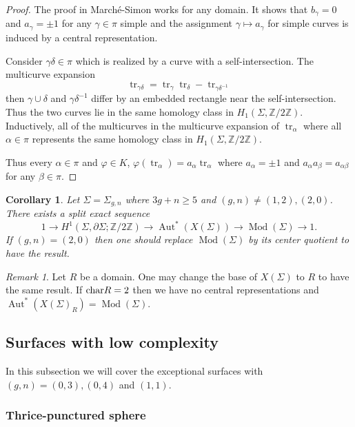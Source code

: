 \documentclass[11pt]{amsart}
\numberwithin{theorem}{section}
\newtheorem{corollary}[theorem]{Corollary}
\theoremstyle{definition}
\theoremstyle{remark}
\newtheorem*{remark}{Remark}
\newcommand{\Z}{{\mathbb{Z}}}
\renewcommand{\char}{\textup{char}}
\DeclareMathOperator{\Aut}{Aut}
\DeclareMathOperator{\Mod}{Mod}
\DeclareMathOperator{\tr}{tr}
\newcommand{\<}{\langle}
\renewcommand{\>}{\rangle}
\begin{document}
\begin{proof}
    The proof in March\'e-Simon works for any domain. It shows that $b_\gamma = 0$ and $a_\gamma = \pm 1$ for any $\gamma \in \pi$ simple and the assignment $\gamma \mapsto a_\gamma$ for simple curves is induced by a central representation.

    
    Consider $\gamma \delta \in \pi$ which is realized by a curve with a self-intersection. The multicurve expansion
    \[
    \tr_{\gamma\delta} = \tr_{\gamma}\tr_\delta - \tr_{\gamma \delta^{-1}}
    \]
    then $\gamma \cup \delta$ and $\gamma \delta^{-1}$ differ by an embedded rectangle near the self-intersection. Thus the two curves lie in the same homology class in $H_1(\Sigma, \Z / 2\Z)$. Inductively, all of the multicurves in the multicurve expansion of $\tr_\alpha$ where all $\alpha \in \pi$ represents the same homology class in $H_1(\Sigma, \Z / 2\Z)$.

    Thus every $\alpha \in \pi$ and $\varphi \in K$, $\varphi(\tr_\alpha) = a_\alpha \tr_\alpha$ where $a_\alpha = \pm 1$ and $a_\alpha a_\beta = a_{\alpha \beta}$ for any $\beta \in \pi$.
\end{proof}

\begin{corollary}\label{main}
    Let $\Sigma = \Sigma_{g, n}$ where $3g + n \geq 5$ and $(g, n) \neq (1, 2), (2, 0)$. There exists a split exact sequence
    \[
    1 \rightarrow H^1(\Sigma, \partial \Sigma ; \Z / 2\Z) \rightarrow \Aut^*(X(\Sigma)) \rightarrow \Mod(\Sigma) \rightarrow 1.
    \] 
    If $(g, n) = (2, 0)$ then one should replace $\Mod(\Sigma)$ by its center quotient to have the result.
\end{corollary}

\begin{remark}
    Let $R$ be a domain. One may change the base of $X(\Sigma)$ to $R$ to have the same result. If $\char R = 2$ then we have no central representations and $\Aut^*(X(\Sigma)_R) = \Mod(\Sigma)$.
\end{remark}

\subsection{Surfaces with low complexity}

In this subsection we will cover the exceptional surfaces with $(g, n) = (0, 3), (0, 4)$ and $(1, 1)$.

\subsubsection{Thrice-punctured sphere}
\end{document}
